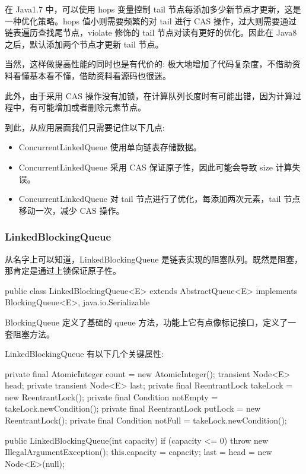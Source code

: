 在 Java1.7 中，可以使用 hops 变量控制 tail 节点每添加多少新节点才更新，这是一种优化策略。hops 值小则需要频繁的对 tail 进行 CAS 操作，过大则需要通过链表遍历查找尾节点，violate 修饰的 tail 节点对读有更好的优化。因此在 Java8 之后，默认添加两个节点才更新 tail 节点。

当然，这样做提高性能的同时也是有代价的: 极大地增加了代码复杂度，不借助资料看懂基本看不懂，借助资料看源码也很迷。

此外，由于采用 CAS 操作没有加锁，在计算队列长度时有可能出错，因为计算过程中，有可能增加或者删除元素节点。

到此，从应用层面我们只需要记住以下几点:
\begin{itemize}
    \item ConcurrentLinkedQueue 使用单向链表存储数据。
    \item ConcurrentLinkedQueue 采用 CAS 保证原子性，因此可能会导致 size 计算失误。
    \item ConcurrentLinkedQueue 对 tail 节点进行了优化，每添加两次元素，tail 节点移动一次，减少 CAS 操作。
\end{itemize}

\subsubsection{LinkedBlockingQueue}

从名字上可以知道，LinkedBlockingQueue 是链表实现的阻塞队列。既然是阻塞，那肯定是通过上锁保证原子性。

\begin{Java}
public class LinkedBlockingQueue<E> extends AbstractQueue<E> implements BlockingQueue<E>, java.io.Serializable
\end{Java}

BlockingQueue 定义了基础的 queue 方法，功能上它有点像标记接口，定义了一套阻塞方法。

LinkedBlockingQueue 有以下几个关键属性:

\begin{Java}
private final AtomicInteger count = new AtomicInteger();
transient Node<E> head;
private transient Node<E> last;
private final ReentrantLock takeLock = new ReentrantLock();
private final Condition notEmpty = takeLock.newCondition();
private final ReentrantLock putLock = new ReentrantLock();
private final Condition notFull = takeLock.newCondition();

public LinkedBlockingQueue(int capacity) {
    if (capacity <= 0) throw new IllegalArgumentException();
    this.capacity = capacity;
    last = head = new Node<E>(null);
}
\end{Java}

